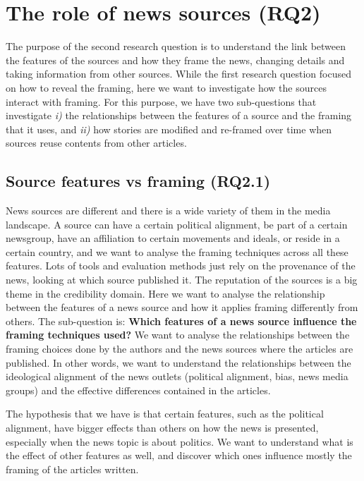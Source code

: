 \section{The role of news sources (RQ2)}
\label{sec:prop_rq2}

The purpose of the second research question is to understand the link between the features of the sources and how they frame the news, changing details and taking information from other sources.
While the first research question focused on how to reveal the framing, here we want to investigate how the sources interact with framing. For this purpose, we have two sub-questions that investigate \emph{i)} the relationships between the features of a source and the framing that it uses, and \emph{ii)} how stories are modified and re-framed over time when sources reuse contents from other articles.

\subsection{Source features vs framing (RQ2.1)}
News sources are different and there is a wide variety of them in the media landscape.
A source can have a certain political alignment, be part of a certain newsgroup, have an affiliation to certain movements and ideals, or reside in a certain country, and we want to analyse the framing techniques across all these features.
Lots of tools and evaluation methods just rely on the provenance of the news, looking at which source published it. The reputation of the sources is a big theme in the credibility domain.
Here we want to analyse the relationship between the features of a news source and how it applies framing differently from others. The sub-question is:
\textbf{Which features of a news source influence the framing techniques used?}
We want to analyse the relationships between the framing choices done by the authors and the news sources where the articles are published. In other words, we want to understand the relationships between the ideological alignment of the news outlets (political alignment, bias, news media groups) and the effective differences contained in the articles.



The hypothesis that we have is that certain features, such as the political alignment, have bigger effects than others on how the news is presented, especially when the news topic is about politics.
We want to understand what is the effect of other features as well, and discover which ones influence mostly the framing of the articles written.

